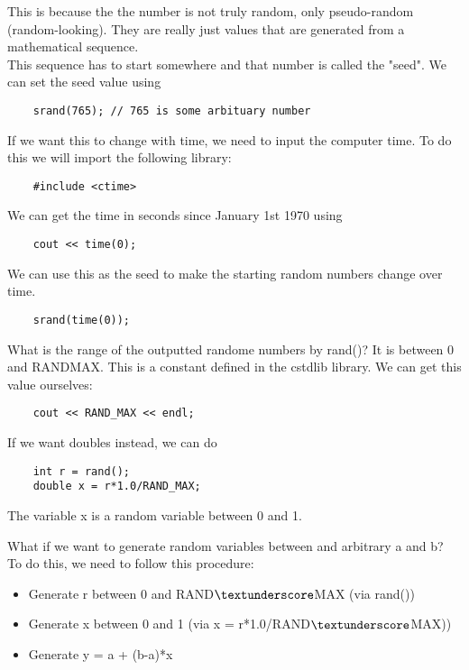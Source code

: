 \documentclass[]{article}
\begin{document}
This is because the the number is not truly random, only pseudo-random (random-looking). They are really just values that are generated from a mathematical sequence.\\

This sequence has to start somewhere and that number is called the "seed". We can set the seed value using

\begin{lstlisting}
	srand(765);	// 765 is some arbituary number
\end{lstlisting}

If we want this to change with time, we need to input the computer time. To do this we will import the following library:

\begin{lstlisting}
	#include <ctime>
\end{lstlisting}

We can get the time in seconds since January 1st 1970 using

\begin{lstlisting}
	cout << time(0);
\end{lstlisting}

We can use this as the seed to make the starting random numbers change over time.

\begin{lstlisting}
	srand(time(0));
\end{lstlisting}

What is the range of the outputted randome numbers by rand()? It is between 0 and RAND\textunderscore MAX. This is a constant defined in the cstdlib library. We can get this value ourselves:

\begin{lstlisting}
	cout << RAND_MAX << endl;
\end{lstlisting}

If we want doubles instead, we can do

\begin{lstlisting}
	int r = rand();
	double x = r*1.0/RAND_MAX;
\end{lstlisting}

The variable x is a random variable between 0 and 1.\\\bigbreak

What if we want to generate random variables between and arbitrary a and b? To do this, we need to follow this procedure:
\begin{itemize}
	\item Generate r between 0 and RAND$\textunderscore$MAX (via rand())
	\item Generate x between 0 and 1 (via x = r*1.0/RAND$\textunderscore$MAX))
	\item Generate y = a + (b-a)*x
\end{itemize} 
\end{document}
